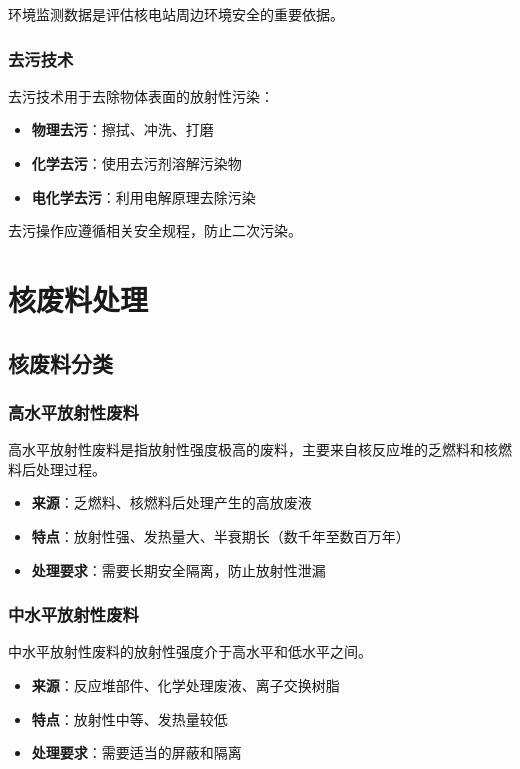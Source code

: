 \documentclass[12pt,UTF8]{ctexbook}
\begin{document}
环境监测数据是评估核电站周边环境安全的重要依据。

\section{去污技术}

去污技术用于去除物体表面的放射性污染：

\begin{itemize}[leftmargin=2cm]
    \item \textbf{物理去污}：擦拭、冲洗、打磨
    \item \textbf{化学去污}：使用去污剂溶解污染物
    \item \textbf{电化学去污}：利用电解原理去除污染
\end{itemize}

去污操作应遵循相关安全规程，防止二次污染。

\part{核废料处理}

\chapter{核废料分类}

\section{高水平放射性废料}

高水平放射性废料是指放射性强度极高的废料，主要来自核反应堆的乏燃料和核燃料后处理过程。

\begin{itemize}[leftmargin=2cm]
    \item \textbf{来源}：乏燃料、核燃料后处理产生的高放废液
    \item \textbf{特点}：放射性强、发热量大、半衰期长（数千年至数百万年）
    \item \textbf{处理要求}：需要长期安全隔离，防止放射性泄漏
\end{itemize}

\section{中水平放射性废料}

中水平放射性废料的放射性强度介于高水平和低水平之间。

\begin{itemize}[leftmargin=2cm]
    \item \textbf{来源}：反应堆部件、化学处理废液、离子交换树脂
    \item \textbf{特点}：放射性中等、发热量较低
    \item \textbf{处理要求}：需要适当的屏蔽和隔离
\end{itemize}
\end{document}
